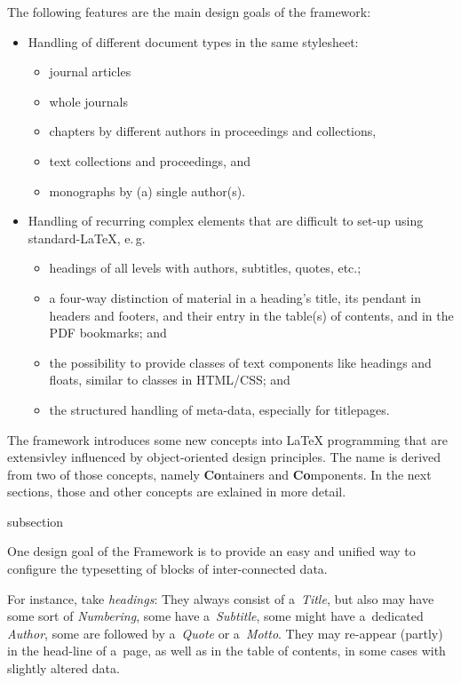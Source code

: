 The following features are the main design goals of the {\CoCoTeX}
framework:
\begin{itemize}
\item Handling of different document types in the same stylesheet:
  \begin{itemize}
  \item journal articles
  \item whole journals
  \item chapters by different authors in proceedings and collections,
  \item text collections and proceedings, and
  \item monographs by (a) single author(s).
  \end{itemize}
\item Handling of recurring complex elements that are difficult to
  set-up using standard-\LaTeX, e.\,g.
  \begin{itemize}
  \item headings of all levels with authors, subtitles, quotes, etc.;
  \item a four-way distinction of material in a heading's title, its
    pendant in headers and footers, and their entry in the table(s) of
    contents, and in the PDF bookmarks; and
  \item the possibility to provide classes of text components like
    headings and floats, similar to classes in HTML/CSS; and
  \item the structured handling of meta-data, especially for
    titlepages.
  \end{itemize}
\end{itemize}

The framework introduces some new concepts into {\LaTeX} programming
that are extensivley influenced by object-oriented design principles.
The name {\CoCoTeX} is derived from two of those concepts, namely
\textbf{Co}ntainers and \textbf{Co}mponents. In the next sections,
those and other concepts are exlained in more detail.



\begin{Heading}[label=sec:concepts]{subsection}
\end{Heading}

One design goal of the {\CoCoTeX} Framework is to provide an easy and
unified way to configure the typesetting of blocks of inter-connected
data.

For instance, take \textit{headings}: They always consist of
a~\textit{Title}, but also may have some sort of \textit{Numbering},
some have a~\textit{Subtitle}, some might have a~dedicated
\textit{Author}, some are followed by a~\textit{Quote} or
a~\textit{Motto}. They may re-appear (partly) in the head-line of
a~page, as well as in the table of contents, in some cases with
slightly altered data.


